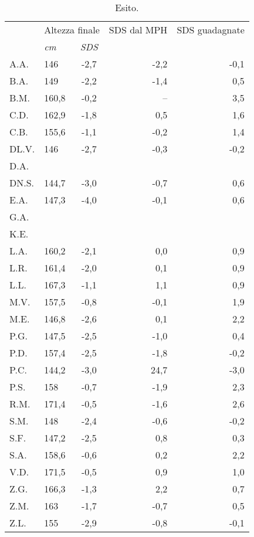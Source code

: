 \begin{table}[!h]
\begin{center}
\addtolength{\tabcolsep}{12pt}
\renewcommand{\arraystretch}{1.1}
\begin{tabular}{llcrr}
\toprule
 & \multicolumn{2}{c}{Altezza finale} 	& SDS dal MPH	& SDS guadagnate \\
\cmidrule(r){2-3}
  & \emph{cm} 	& \emph{SDS}  			& 				& \\
\midrule
A.A.	& 146   & -2,7  & -2,2  & -0,1  \\
B.A.	& 149   & -2,2  & -1,4  & 0,5   \\
B.M.	& 160,8 & -0,2  & --    & 3,5   \\
C.D.	& 162,9 & -1,8  & 0,5   & 1,6   \\
C.B.	& 155,6 & -1,1  & -0,2  & 1,4   \\
DL.V.	& 146   & -2,7  & -0,3  & -0,2  \\
D.A.	&       &       &       &       \\
DN.S.	& 144,7 & -3,0  & -0,7  & 0,6   \\
E.A.	& 147,3 & -4,0  & -0,1  & 0,6   \\
G.A.	&       &       &       &       \\
K.E.	&       &       &       &       \\
L.A.	& 160,2 & -2,1  & 0,0   & 0,9   \\
L.R.	& 161,4 & -2,0  & 0,1   & 0,9   \\
L.L.	& 167,3 & -1,1  & 1,1   & 0,9   \\
M.V.	& 157,5 & -0,8  & -0,1  & 1,9   \\
M.E.	& 146,8 & -2,6  & 0,1   & 2,2   \\
P.G.	& 147,5 & -2,5  & -1,0  & 0,4   \\
P.D.	& 157,4 & -2,5  & -1,8  & -0,2  \\
P.C.	& 144,2 & -3,0  & 24,7  & -3,0  \\
P.S.	& 158   & -0,7  & -1,9  & 2,3   \\
R.M.	& 171,4 & -0,5  & -1,6  & 2,6   \\
S.M.	& 148   & -2,4  & -0,6  & -0,2  \\
S.F.	& 147,2 & -2,5  & 0,8   & 0,3   \\
S.A.	& 158,6 & -0,6  & 0,2   & 2,2   \\
V.D.	& 171,5 & -0,5  & 0,9   & 1,0   \\
Z.G.	& 166,3 & -1,3  & 2,2   & 0,7   \\
Z.M.	& 163   & -1,7  & -0,7  & 0,5   \\
Z.L.	& 155   & -2,9  & -0,8  & -0,1  \\
\bottomrule
\end{tabular}
\end{center}
\caption{Esito.}
\label{tab:Esito}
\end{table}

